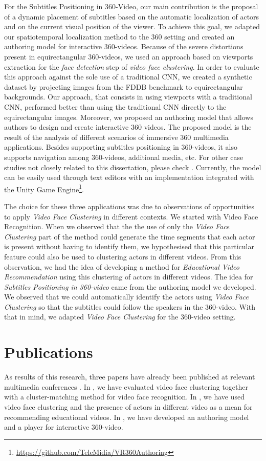 For the Subtitles Positioning in 360-Video, our main contribution is the proposal of a dynamic placement of subtitles based on the automatic localization of actors and on the current visual position of the viewer. To achieve this goal, we adapted our spatiotemporal localization method to the 360 setting and created an authoring model for interactive 360-videos. Because of the severe distortions present in equirectangular 360-videos, we used an approach based on viewports extraction for the \emph{face detection} step of \emph{video face clustering}. In order to evaluate this approach against the sole use of a traditional CNN, we created a synthetic dataset by projecting images from the FDDB benchmark to equirectangular backgrounds. Our approach, that consists in using viewports with a traditional CNN, performed better than using the traditional CNN directly to the equirectangular images. Moreover, we proposed an authoring model that allows authors to design and create
interactive 360 videos. The proposed model is the result of the analysis of different scenarios of immersive 360 multimedia applications. Besides supporting subtitles positioning in 360-videos, it also supports navigation among 360-videos, additional media, etc. For other case studies not closely related to this dissertation, please check \cite{mendes2020authoring}. Currently, the model can be easily used through text editors with an implementation integrated with the Unity Game Engine\footnote{\url{https://github.com/TeleMidia/VR360Authoring}}.

The choice for these three applications was due to observations of opportunities to apply \emph{Video Face Clustering} in different contexts. We started with Video Face Recognition. When we observed that the the use of only the \emph{Video Face Clustering} part of the method could generate the time segments that each actor is present without having to identify them, we hypothesised that this particular feature could also be used to clustering actors in different videos. From this observation, we had the idea of developing a method for \emph{Educational Video Recommendation} using this clustering of actors in different videos. The idea for \emph{Subtitles Positioning in 360-video} came from the authoring model we developed. We observed that we could automatically identify the actors using \emph{Video Face Clustering} so that the subtitles could follow the speakers in the 360-video. With that in mind, we adapted \emph{Video Face Clustering} for the 360-video setting. 

\section{Publications}

 As results of this research, three papers have already been published at relevant multimedia conferences \cite{mendes2020cluster,mendes2020ISM, mendes2020authoring}. In \cite{mendes2020cluster}, we have evaluated video face clustering together with a cluster-matching method for video face recognition. In \cite{mendes2020ISM}, we have used video face clustering and the presence of actors in different video as a mean for recommending educational videos. In \cite{mendes2020authoring}, we have developed an authoring model and a player for interactive 360-video. 